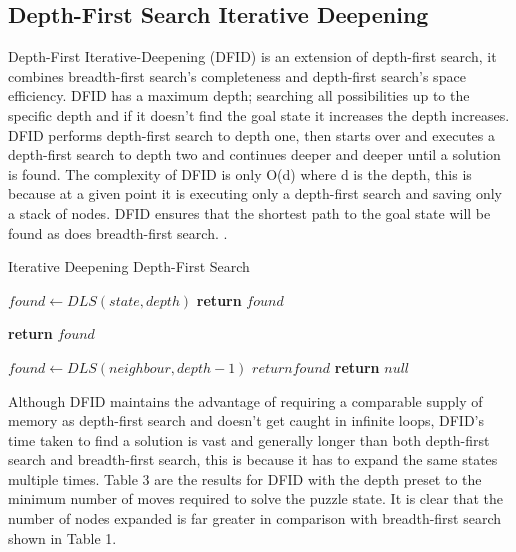 \documentclass[final]{cmpreport}
\begin{document}
\subsection{Depth-First Search Iterative Deepening}
Depth-First Iterative-Deepening (DFID) is an extension of depth-first search, it combines breadth-first search's completeness and depth-first search's space efficiency. DFID has a maximum depth; searching all possibilities up to the specific depth and if it doesn't find the goal state it increases the depth increases. DFID performs depth-first search to depth one, then starts over and executes a depth-first search to depth two and continues deeper and deeper until a solution is found. The complexity of DFID is only O(d) where d is the depth, this is because at a given point it is executing only a depth-first search and saving only a stack of nodes. DFID ensures that the shortest path to the goal state will be found as does breadth-first search. \citep{DBLP:conf/otm/MeissnerB11}.
\makeatletter
\def\BState{\State\hskip-\ALG@thistlm}
\makeatother



	\begin{algorithm}
	\caption{Iterative Deepening Depth-First Search}\label{Solvable}
	\begin{algorithmic}[1]
		\State$ found \gets DLS(state, depth)$
		\State \textbf{return} $found$
		\EndIf
		\EndFor
		\EndProcedure
		
		\State \textbf{return} $found$
		\EndIf
		
		\State $found \gets DLS(neighbour, depth-1)$
		\State$return found$
		\EndIf
		\EndFor
		\EndIf 
		\State \textbf{return} $null$
		\EndProcedure
	\end{algorithmic}	
\end{algorithm}	

Although DFID maintains the advantage of requiring a comparable supply of memory as depth-first search and doesn't get caught in infinite loops, DFID's time taken to find a solution is vast and generally longer than both depth-first search and breadth-first search, this is because it has to expand the same states multiple times. Table 3 are the results for DFID with the depth preset to the minimum number of moves required to solve the puzzle state. It is clear that the number of nodes expanded is far greater in comparison with breadth-first search shown in Table 1.
\end{document}

